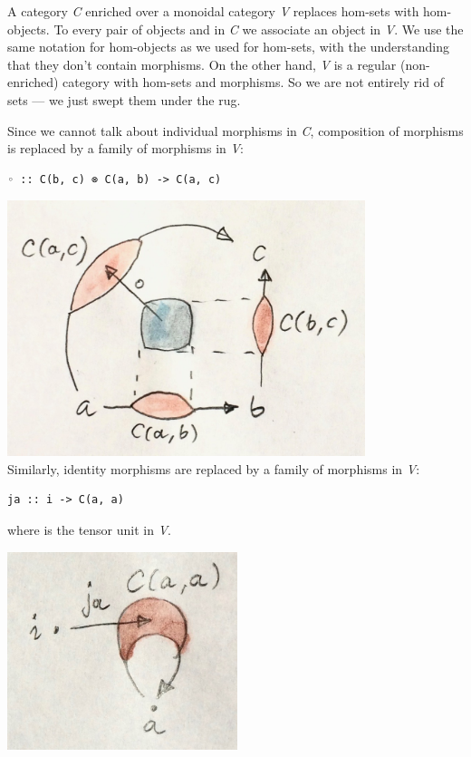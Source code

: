 A category \emph{C} enriched over a monoidal category \emph{V} replaces
hom-sets with hom-objects. To every pair of objects  and
 in \emph{C} we associate an object  in
\emph{V}. We use the same notation for hom-objects as we used for
hom-sets, with the understanding that they don't contain morphisms. On
the other hand, \emph{V} is a regular (non-enriched) category with
hom-sets and morphisms. So we are not entirely rid of sets --- we just
swept them under the rug.

Since we cannot talk about individual morphisms in \emph{C}, composition
of morphisms is replaced by a family of morphisms in \emph{V}:

\begin{verbatim}
◦ :: C(b, c) ⊗ C(a, b) -> C(a, c)
\end{verbatim}

\includegraphics[width=4.11458in]{images/composition.jpg}\\
Similarly, identity morphisms are replaced by a family of morphisms in
\emph{V}:

\begin{verbatim}
ja :: i -> C(a, a)
\end{verbatim}

where  is the tensor unit in \emph{V}.

\includegraphics[width=2.64583in]{images/id.jpg}

